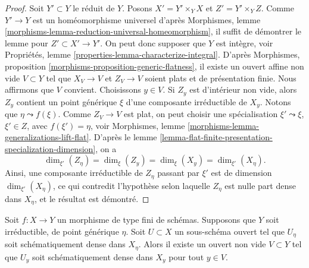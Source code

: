 \begin{proof}
Soit $Y' \subset Y$ le réduit de $Y$.
Posons $X' = Y' \times_Y X$ et $Z' = Y' \times_Y Z$.
Comme $Y' \to Y$ est un homéomorphisme universel d'après
Morphismes, lemme \ref{morphisms-lemma-reduction-universal-homeomorphism},
il suffit de démontrer le lemme pour $Z' \subset X' \to Y'$.
On peut donc supposer que $Y$ est intègre, voir
Propriétés, lemme \ref{properties-lemma-characterize-integral}.
D'après
Morphismes, proposition \ref{morphisms-proposition-generic-flatness},
il existe un ouvert affine non vide $V \subset Y$ tel que
$X_V \to V$ et $Z_V \to V$ soient plats et de présentation finie.
Nous affirmons que $V$ convient.
Choisissons $y \in V$. Si $Z_y$ est d'intérieur non vide, alors $Z_y$ contient
un point générique $\xi$ d'une composante irréductible de $X_y$.
Notons que $\eta \leadsto f(\xi)$. Comme $Z_V \to V$ est plat, on peut
choisir une spécialisation $\xi' \leadsto \xi$, $\xi' \in Z$,
avec $f(\xi') = \eta$, voir
Morphismes, lemme \ref{morphisms-lemma-generalizations-lift-flat}.
D'après le
lemme \ref{lemma-flat-finite-presentation-specialization-dimension},
on a
$$
\dim_{\xi'}(Z_\eta) = \dim_{\xi}(Z_y) = \dim_{\xi}(X_y) = \dim_{\xi'}(X_\eta).
$$
Ainsi, une composante irréductible de $Z_\eta$ passant par $\xi'$ est
de dimension $\dim_{\xi'}(X_\eta)$, ce qui contredit l'hypothèse selon laquelle
$Z_\eta$ est nulle part dense dans $X_\eta$, et le résultat est démontré.
\end{proof}

\begin{lemma}
\label{lemma-scheme-theoretically-dense-generic-fibre}
Soit $f : X \to Y$ un morphisme de type fini de schémas.
Supposons que $Y$ soit irréductible, de point générique $\eta$.
Soit $U \subset X$ un sous-schéma ouvert tel que $U_\eta$ soit
schématiquement dense dans $X_\eta$.
Alors il existe un ouvert non vide $V \subset Y$ tel
que $U_y$ soit schématiquement dense dans $X_y$ pour tout $y \in V$.
\end{lemma}

